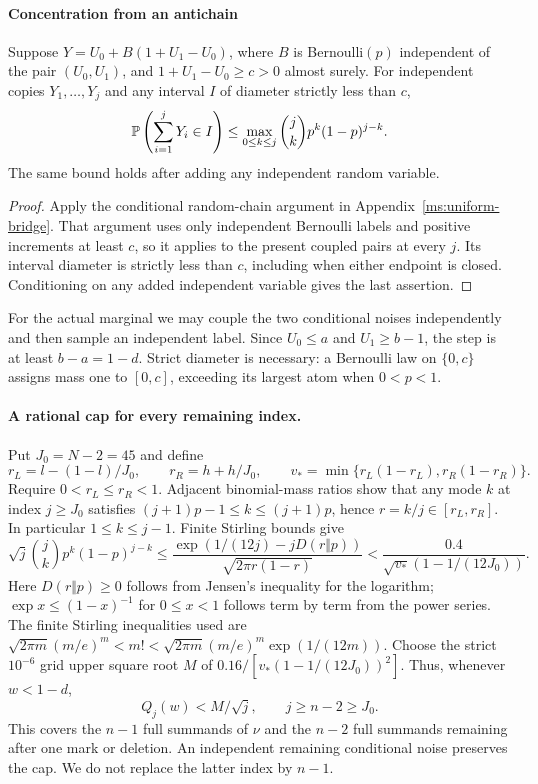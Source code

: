 \paragraph{Concentration from an antichain}
\begin{lemma}
Suppose $Y=U_0+B(1+U_1-U_0)$, where $B$ is Bernoulli$(p)$ independent
of the pair $(U_0,U_1)$, and $1+U_1-U_0\ge c>0$ almost surely.
For independent copies $Y_1,\ldots,Y_j$ and any interval $I$ of diameter
strictly less than $c$,
\[
 \mathbb P\left(\sum_{i=1}^jY_i\in I\right)
 \le \max_{0\le k\le j}\binom jk p^k(1-p)^{j-k}.
\]
The same bound holds after adding any independent random variable.
\end{lemma}
\begin{proof}
Apply the conditional random-chain argument in
Appendix~\ref{ms:uniform-bridge}. That argument uses only independent
Bernoulli labels and positive increments at least $c$, so it applies to
the present coupled pairs at every $j$. Its interval diameter is strictly
less than $c$, including when either endpoint is closed. Conditioning on
any added independent variable gives the last assertion.
\end{proof}
For the actual marginal we may couple the two conditional noises
independently and then sample an independent label. Since $U_0\le a$ and
$U_1\ge b-1$, the step is at least $b-a=1-d$.
Strict diameter is necessary: a Bernoulli law on $\{0,c\}$ assigns mass
one to $[0,c]$, exceeding its largest atom when $0<p<1$.

\paragraph{A rational cap for every remaining index.}
Put $J_0=N-2=45$ and define
\[
 r_L=l-(1-l)/J_0,\qquad r_R=h+h/J_0,\qquad
 v_* =\min\{r_L(1-r_L),r_R(1-r_R)\}.
\]
Require $0<r_L\le r_R<1$. Adjacent binomial-mass ratios
show that any mode $k$ at index $j\ge J_0$ satisfies
$(j+1)p-1\le k\le(j+1)p$, hence $r=k/j\in[r_L,r_R]$.
In particular $1\le k\le j-1$. Finite Stirling bounds give
\[
 \sqrt j\binom jk p^k(1-p)^{j-k}
 \le\frac{\exp(1/(12j)-jD(r\Vert p))}{\sqrt{2\pi r(1-r)}}
 <\frac{0.4}{\sqrt{v_*}(1-1/(12J_0))}.
\]
Here $D(r\Vert p)\ge0$ follows from Jensen's inequality for the logarithm;
$\exp x\le(1-x)^{-1}$ for $0\le x<1$ follows term by term from the
power series. The finite Stirling inequalities used are
$\sqrt{2\pi m}(m/e)^m<m!<\sqrt{2\pi m}(m/e)^m\exp(1/(12m))$.
Choose the strict $10^{-6}$ grid upper square root $M$ of
$0.16/[v_*(1-1/(12J_0))^2]$. Thus, whenever $w<1-d$,
\begin{equation}\label{ms:fourier:cut49:conf:antichainconcentration}
 Q_j(w)<M/\sqrt j,\qquad j\ge n-2\ge J_0.
\end{equation}
This covers the $n-1$ full summands of $\nu$ and the $n-2$ full summands
remaining after one mark or deletion. An independent remaining conditional
noise preserves the cap. We do not replace the latter index by $n-1$.

